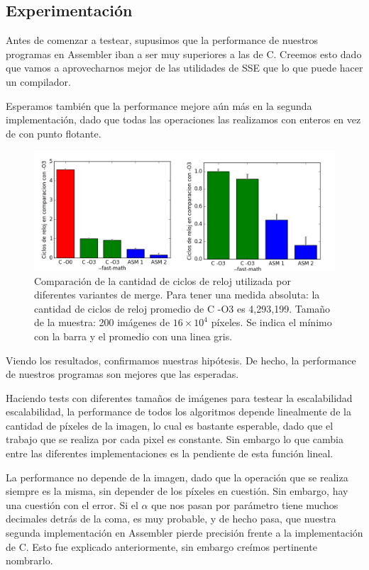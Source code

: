 \pagebreak

\subsection{Experimentación}

Antes de comenzar a testear, supusimos que la performance de nuestros programas en Assembler iban a ser muy superiores a las de C. Creemos esto dado que vamos a aprovecharnos mejor de las utilidades de SSE que lo que puede hacer un compilador. 

Esperamos también que la performance mejore aún más en la segunda implementación, dado que todas las operaciones las realizamos con enteros en vez de con punto flotante.


\begin{figure}[!hbt] 
  \centering
  \includegraphics[scale=0.7]{images/merge-all.png}
  \caption{Comparación de la cantidad de ciclos de reloj utilizada por diferentes variantes de merge. Para tener una medida absoluta: la cantidad de ciclos de reloj promedio de C -O3 es 4,293,199. Tamaño de la muestra: 200 imágenes de $16 \times 10^4$ píxeles. Se indica el mínimo con la barra y el promedio con una linea gris.}
\end{figure}


Viendo los resultados, confirmamos nuestras hipótesis. De hecho, la performance de nuestros programas son mejores que las esperadas.

Haciendo tests con diferentes tamaños de imágenes para testear la escalabilidad escalabilidad, la performance de todos los algoritmos depende linealmente de la cantidad de píxeles de la imagen, lo cual es bastante esperable, dado que el trabajo que se realiza por cada pixel es constante. Sin embargo lo que cambia entre las diferentes implementaciones es la pendiente de esta función lineal.

La performance no depende de la imagen, dado que la operación que se realiza siempre es la misma, sin depender de los píxeles en cuestión.
Sin embargo, hay una cuestión con el error. Si el $\alpha$ que nos pasan por parámetro tiene muchos decimales detrás de la coma, es muy probable, y de hecho pasa, que nuestra segunda implementación en Assembler pierde precisión frente a la implementación de C. Esto fue explicado anteriormente, sin embargo creímos pertinente nombrarlo.

